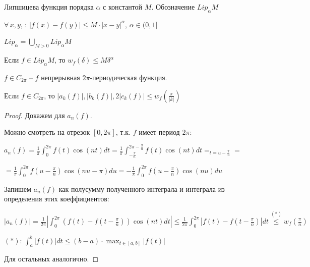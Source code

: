 \begin{definition}
    Липшицева функция порядка $\alpha$ с константой $M$. Обозначение $Lip_\alpha M$

    $\forall \, x, y, \, : \, |f(x) - f(y)| \leqslant M \cdot |x - y|^\alpha$, $\alpha \in (0, 1]$
\end{definition}

\begin{definition}
    $Lip_\alpha = \bigcup\limits_{M > 0} Lip_\alpha M$
\end{definition}

\begin{remark}
    Если $f \in Lip_\alpha M$, то $w_f (\delta) \leqslant M \delta^\alpha$
\end{remark}


\begin{definition}
    $f \in C_{2\pi}$ -- $f$ непрерывная $2\pi$-периодическая функция.
\end{definition}

\begin{theorem}
    Если $f \in C_{2\pi}$, то $|a_k (f)|, |b_k (f)|, 2|c_k (f)| \leqslant w_f (\frac{\pi}{|k|})$
\end{theorem}

\begin{proof}

    Докажем для $a_n(f)$.

    Можно смотреть на отрезок $[0, 2\pi]$, т.к. $f$ имеет период $2\pi$:

    $a_n(f) = \frac{1}{\pi} \int_{0}^{2\pi} f(t) \cos(nt) dt = \frac{1}{\pi} \int_{-\frac{\pi}{n}}^{2\pi - \frac{\pi}{n}} f(t) \cos(nt) dt =_{t = u - \frac{\pi}{n}} = $

    $= \frac{1}{\pi} \int_{0}^{2\pi} f(u - \frac{\pi}{n}) \cos(nu - \pi) du = -\frac{1}{\pi} \int_{0}^{2\pi} f(u - \frac{\pi}{n}) \cos(n u) du$

    Запишем $a_n(f)$ как полусумму полученного интеграла и интеграла из определения этих коеффициентов:

    $|a_n(f)| = \frac{1}{2\pi} \left| \int_{0}^{2\pi} (f(t) - f(t - \frac{\pi}{n})) \cos(nt) dt \right| \leq \frac{1}{2 \pi} \int_{0}^{2\pi} | f(t) - f(t - \frac{\pi}{n}) | dt \overset{(*)}{\leq} w_{f}(\frac{\pi}{n})$

    $(*)$: $\int_{a}^{b} |f(t)| dt \leq (b - a) \cdot \max_{t \in [a, b]} |f(t)|$



    Для остальных аналогично.
\end{proof}

